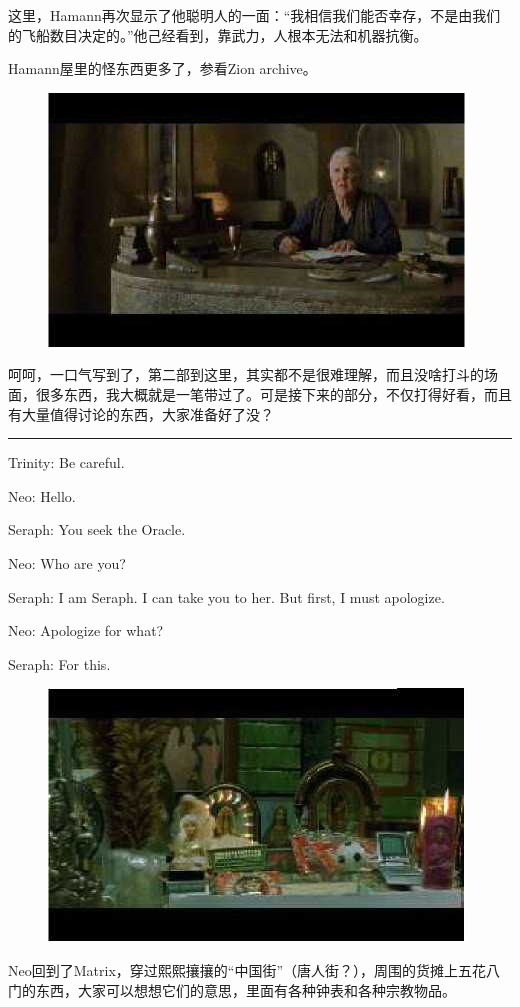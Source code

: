 \documentclass{ctexart}
\newcommand{\myparsep}{\noindent \rule[0.5ex]{\linewidth}{1pt}}
\newenvironment{myquote}{\color{green} \setlength{\leftskip}{6em} \setlength{\rightskip}{4em} \setlength{\parindent}{-2em}}{\par}
\begin{document}
这里，Hamann再次显示了他聪明人的一面：“我相信我们能否幸存，不是由我们的飞船数目决定的。”他己经看到，靠武力，人根本无法和机器抗衡。

Hamann屋里的怪东西更多了，参看Zion archive。

\begin{figure}[htb]
\centering
\includegraphics[width=0.5\linewidth]{fig/read_reloaded-55}
\end{figure}

呵呵，一口气写到了，第二部到这里，其实都不是很难理解，而且没啥打斗的场面，很多东西，我大概就是一笔带过了。可是接下来的部分，不仅打得好看，而且有大量值得讨论的东西，大家准备好了没？

\myparsep

\begin{myquote}
Trinity: Be careful.

Neo: Hello.

Seraph: You seek the Oracle.

Neo: Who are you?

Seraph: I am Seraph. I can take you to her. But first, I must apologize.

Neo: Apologize for what?

Seraph: For this.
\end{myquote}

\begin{figure}[htb]
\centering
\includegraphics[width=0.5\linewidth]{fig/read_reloaded-56}
\end{figure}

Neo回到了Matrix，穿过熙熙攘攘的“中国街”（唐人街？），周围的货摊上五花八门的东西，大家可以想想它们的意思，里面有各种钟表和各种宗教物品。
\end{document}
